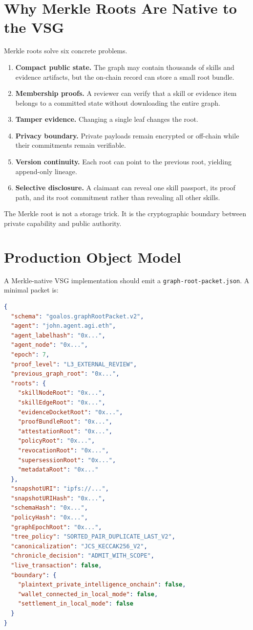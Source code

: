 \documentclass[11pt,letterpaper]{article}
\begin{document}
\section{Why Merkle Roots Are Native to the VSG}
Merkle roots solve six concrete problems.
\begin{enumerate}
\item \textbf{Compact public state.} The graph may contain thousands of skills and evidence artifacts, but the on-chain record can store a small root bundle.
\item \textbf{Membership proofs.} A reviewer can verify that a skill or evidence item belongs to a committed state without downloading the entire graph.
\item \textbf{Tamper evidence.} Changing a single leaf changes the root.
\item \textbf{Privacy boundary.} Private payloads remain encrypted or off-chain while their commitments remain verifiable.
\item \textbf{Version continuity.} Each root can point to the previous root, yielding append-only lineage.
\item \textbf{Selective disclosure.} A claimant can reveal one skill passport, its proof path, and its root commitment rather than revealing all other skills.
\end{enumerate}
\begin{thesisbox}
The Merkle root is not a storage trick. It is the cryptographic boundary between private capability and public authority.
\end{thesisbox}

\section{Production Object Model}
A Merkle-native VSG implementation should emit a \texttt{graph-root-packet.json}. A minimal packet is:
\begin{lstlisting}[language=json,caption={Graph-root packet skeleton.}]
{
  "schema": "goalos.graphRootPacket.v2",
  "agent": "john.agent.agi.eth",
  "agent_labelhash": "0x...",
  "agent_node": "0x...",
  "epoch": 7,
  "proof_level": "L3_EXTERNAL_REVIEW",
  "previous_graph_root": "0x...",
  "roots": {
    "skillNodeRoot": "0x...",
    "skillEdgeRoot": "0x...",
    "evidenceDocketRoot": "0x...",
    "proofBundleRoot": "0x...",
    "attestationRoot": "0x...",
    "policyRoot": "0x...",
    "revocationRoot": "0x...",
    "supersessionRoot": "0x...",
    "metadataRoot": "0x..."
  },
  "snapshotURI": "ipfs://...",
  "snapshotURIHash": "0x...",
  "schemaHash": "0x...",
  "policyHash": "0x...",
  "graphEpochRoot": "0x...",
  "tree_policy": "SORTED_PAIR_DUPLICATE_LAST_V2",
  "canonicalization": "JCS_KECCAK256_V2",
  "chronicle_decision": "ADMIT_WITH_SCOPE",
  "live_transaction": false,
  "boundary": {
    "plaintext_private_intelligence_onchain": false,
    "wallet_connected_in_local_mode": false,
    "settlement_in_local_mode": false
  }
}
\end{lstlisting}
\end{document}
